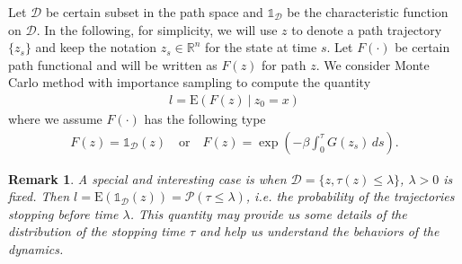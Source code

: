 \documentclass[final]{siamltex}
\newtheorem{remark}{Remark}
\begin{document}
Let $\mathcal{D}$ be certain subset in the path space and
$\mathds{1}_{\mathcal{D}}$ be the
characteristic function on $\mathcal{D}$. 
In the following, for simplicity, we will use $z$ to denote a path trajectory
$\{z_s\}$ and keep the notation $z_s \in \mathbb{R}^n$ for the state at time $s$. 
Let $F(\cdot)$ be certain path functional and will be written as $F(z)$ for
path $z$. 
We consider Monte Carlo method with importance sampling to compute the quantity
\begin{align}
  l = \mathrm{E}(F(z)~|~z_0 = x)
  \label{mean-l}
\end{align}
where we assume $F(\cdot)$ has the following type
\begin{align}
  F(z) = \mathds{1}_{\mathcal{D}}(z) \quad \mbox{or} \quad F(z) = \exp(-\beta\int_0^\tau G(z_s) \,ds).
  \label{path-fun-f}
\end{align}
\begin{remark}
  A special and interesting case is when $\mathcal{D} = \{z, \tau(z) \le \lambda\}$,
  $\lambda > 0$ is fixed. Then $l = \mathrm{E}(\mathds{1}_{\mathcal{D}}(z)) =
  \mathcal{P}(\tau \le \lambda)$, i.e. the probability of the trajectories
  stopping before time $\lambda$. This quantity may provide us some details of the
  distribution of the stopping time $\tau$ and help us understand the
  behaviors of the dynamics.
\end{remark}
\end{document}
